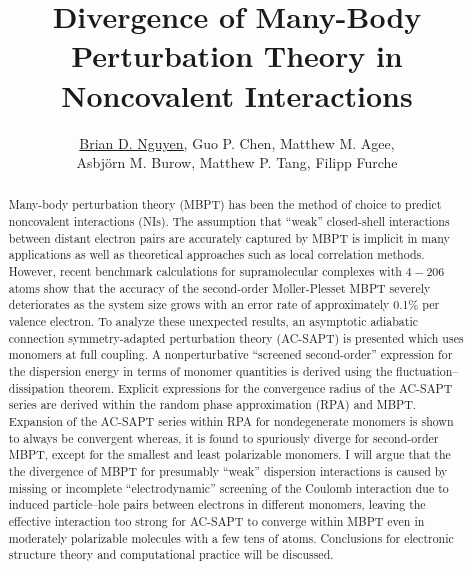 \documentclass[12pt]{article}
\title{Divergence of Many-Body Perturbation Theory in Noncovalent Interactions}
\author{\underline{Brian D. Nguyen},
  Guo P. Chen, Matthew M. Agee, \\ Asbj{\"o}rn M. Burow,
  Matthew P. Tang,
  Filipp Furche}
\begin{document}
\maketitle

\begin{abstract}
  Many-body perturbation theory (MBPT) has been the method of choice to
  predict noncovalent interactions (NIs). The assumption that ``weak''
  closed-shell interactions between distant electron pairs are accurately
  captured by MBPT is implicit in many applications as well as theoretical
  approaches such as local correlation methods. However, recent benchmark
  calculations for supramolecular complexes with $4-206$ atoms show that the
  accuracy of the second-order M{\o}ller-Plesset MBPT severely deteriorates
  as the system size grows with an error rate of approximately 0.1$\%$
  per valence electron. To analyze these unexpected results, an asymptotic
  adiabatic connection symmetry-adapted perturbation theory (AC-SAPT) is presented
  which uses monomers at full coupling. A nonperturbative ``screened
  second-order'' expression for the dispersion energy in terms of monomer
  quantities is derived using the fluctuation--dissipation theorem. Explicit
  expressions for the convergence radius of the AC-SAPT series are derived
  within the random phase approximation (RPA) and MBPT. Expansion of the
  AC-SAPT series within RPA for nondegenerate monomers is shown to always be
  convergent whereas, it is found to spuriously diverge for second-order MBPT,
  except for the smallest and least polarizable monomers. I will argue that
  the the divergence of MBPT for presumably ``weak'' dispersion interactions is
  caused by missing or incomplete ``electrodynamic'' screening of the Coulomb
  interaction due to induced particle--hole pairs between electrons in different
  monomers, leaving the effective interaction too strong for AC-SAPT to converge
  within MBPT even in moderately polarizable molecules with a few tens of atoms.
  Conclusions for electronic structure theory and computational practice will be
  discussed.
\end{abstract}
\end{document}
